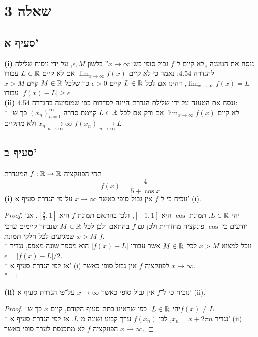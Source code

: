 \section{שאלה 3}
\subsection{סעיף א'}
\textbf{(i)}
ננסח את הטענה „לא קיים ל־$f$ גבול סופי כש־$x \to \infty$”
בלשון $\epsilon, M$, על־ידי ניסוח שלילה להגדרה 4.54:
נאמר כי לא קיים $\lim_{x \to \infty} f(x)$
אם לא קיים $L \in \mathbb{R}$ עבורו $\lim_{x \to \infty} f(x) = L$,
דהינו אם לכל $L \in \mathbb{R}$ קיים $\epsilon > 0$ כך שלכל $M \in \mathbb{R}$
קיים $x > M$ עבורו $\left| f(x) - L\right| \ge \epsilon$. \\
\textbf{(ii)}
ננסח את הטענה על־ידי שלילת הגדרת היינה לסדרות כפי שמופיעה בהגדרה 4.54: \\*
לא קיים $\lim_{x \to \infty}f(x)$ אם ורק אם
לכל $L \in \mathbb{R}$
קיימת סדרה ${(x_n)}_{n = 1}^\infty$
כך ש־$x_n \underset{n \to \infty}{\rightarrow} \infty$
ולא מתקיים $f(x_n) \underset{n \to \infty}{\rightarrow} L$

\subsection{סעיף ב'}
תהי הפונקציה $f: \mathbb{R} \to \mathbb{R}$ המוגדרת
\[
	f(x) = \frac{4}{5 + \cos x}
\]
\textbf{(i)}
נוכיח כי ל־$f$ אין גבול סופי כאשר $x \to \infty$ על־פי הגדרת סעיף א' (i).
\begin{proof}
	יהי $L \in \mathbb{R}$.
	תמונת $\cos$ היא $[-1, 1]$, ולכן בהתאם תמונת $f$ היא $[\frac{2}{3}, 1]$.
	אנו יודעים כי $\cos$ פונקציה מחזורית ולכן גם $f$ בהתאם ולכן לכל $M \in \mathbb{R}$ שנבחר קיימים ערכי $x > M$ שמגיעים לכל חלקי תמונת $f$. \\*
	נוכל למצוא $x > M$ לכל $M \in \mathbb{R}$ אשר עבורו $|f(x) - L|$ הוא מספר שונה מאפס, נגדיר $\epsilon = |f(x) - L|/2$. \\*
	אז לפי הגדרת סעיף א' (i) לפונקציה $f$ אין גבול סופי כאשר $x \to \infty$. \\*
\end{proof}
\textbf{(ii)}
נוכיח כי ל־$f$ אין גבול סופי כאשר $x \to \infty$ על־פי הגדרת סעיף א' (ii).
\begin{proof}
	יהי $L \in \mathbb{R}$. כפי שראינו בתת־סעיף הקודם, קיים $x$ כך ש־$f(x) \ne L$. \\*
	נגדיר $x_n = x + 2 \pi n$, לכן $f(x_n)$ ערך קבוע ושונה מ־$L$.
	אז לפי הגדרת סעיף א' (ii) הפונקציה $f$ לא מתכנסת לערך סופי כאשר $x \to \infty$.
\end{proof}

